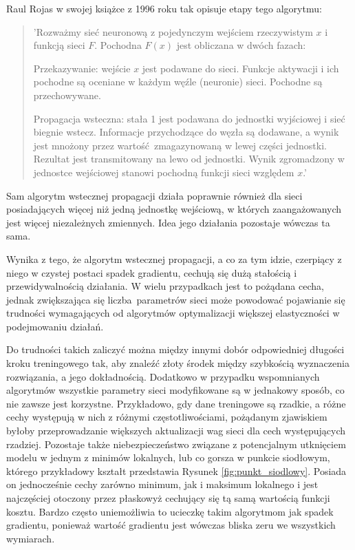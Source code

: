 \begin{enumerate}
    Raul Rojas w swojej książce \cite{systematic_introduction} z 1996 roku tak
    opisuje etapy tego algorytmu:

    \begin{quote}
      'Rozważmy sieć neuronową z pojedynczym wejściem rzeczywistym $x$ i funkcją
      sieci $F$. Pochodna $F(x)$ jest obliczana w dwóch fazach:

      Przekazywanie: wejście $x$ jest podawane do sieci. Funkcje aktywacji i ich pochodne są oceniane w każdym węźle (neuronie) sieci. Pochodne są przechowywane.

      Propagacja wsteczna: stała 1 jest podawana do jednostki wyjściowej i sieć biegnie wstecz. Informacje przychodzące do węzła są dodawane, a wynik jest mnożony przez wartość zmagazynowaną w lewej części jednostki. Rezultat jest transmitowany na lewo od jednostki. Wynik zgromadzony w jednostce wejściowej stanowi pochodną funkcji sieci względem $x$.'
    \end{quote}

    Sam algorytm wstecznej propagacji działa poprawnie również dla sieci posiadających
    więcej niż jedną jednostkę wejściową, w których zaangażowanych jest więcej
    niezależnych zmiennych. Idea jego działania pozostaje wówczas ta sama.

    Wynika z tego, że algorytm wstecznej propagacji, a co za tym idzie, czerpiący z
    niego w czystej postaci spadek gradientu, cechują się dużą stałością i
    przewidywalnością działania. W wielu przypadkach jest to pożądana cecha, jednak
    zwiększająca się liczba parametrów sieci może powodować pojawianie się trudności
    wymagających od algorytmów optymalizacji większej elastyczności w podejmowaniu działań.

    Do trudności takich zaliczyć można między innymi dobór odpowiedniej długości
    kroku treningowego tak, aby znaleźć złoty środek między szybkością wyznaczenia
    rozwiązania, a jego dokładnością. Dodatkowo w przypadku wspomnianych algorytmów
    wszystkie parametry sieci modyfikowane są w jednakowy sposób, co nie zawsze jest
    korzystne. Przykładowo, gdy dane treningowe są rzadkie, a różne cechy występują
    w nich z różnymi częstotliwościami, pożądanym zjawiskiem byłoby przeprowadzanie większych
    aktualizacji wag sieci dla cech występujących rzadziej. Pozostaje także niebezpieczeństwo
    związane z potencjalnym utknięciem modelu w jednym z minimów lokalnych, lub co gorsza
    w punkcie siodłowym, którego przykładowy kształt przedstawia Rysunek \ref{fig:punkt_siodlowy}.
    Posiada on jednocześnie cechy zarówno minimum, jak i maksimum lokalnego i jest najczęściej
    otoczony przez płaskowyż cechujący się tą samą wartością funkcji kosztu. Bardzo często
    uniemożliwia to ucieczkę takim algorytmom jak spadek gradientu, ponieważ wartość
    gradientu jest wówczas bliska zeru we wszystkich wymiarach.


\end{enumerate}
